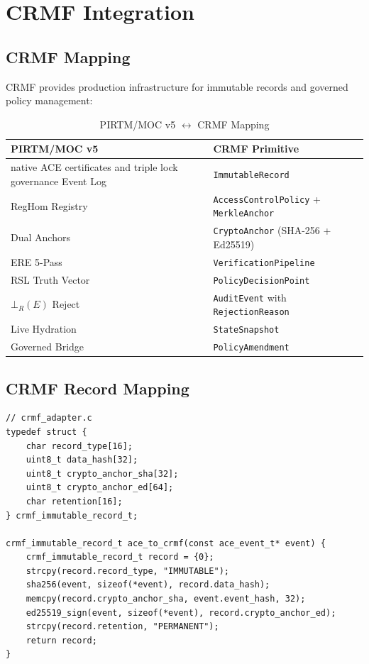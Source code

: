 \documentclass[11pt,a4paper]{article}
\begin{document}
\section{CRMF Integration}

\subsection{CRMF Mapping}

CRMF provides production infrastructure for immutable records and governed policy management:

\begin{table}[h]
\centering
\caption{PIRTM/MOC v5 $\leftrightarrow$ CRMF Mapping}
\label{tab:crmf_mapping}
\begin{tabular}{@{}l l@{}}
\toprule
\textbf{PIRTM/MOC v5} & \textbf{CRMF Primitive} \\
\midrule
native ACE certificates and triple lock governance Event Log & \texttt{ImmutableRecord} \\
RegHom Registry & \texttt{AccessControlPolicy} + \texttt{MerkleAnchor} \\
Dual Anchors & \texttt{CryptoAnchor} (SHA-256 + Ed25519) \\
ERE 5-Pass & \texttt{VerificationPipeline} \\
RSL Truth Vector & \texttt{PolicyDecisionPoint} \\
$\bot_R(E)$ Reject & \texttt{AuditEvent} with \texttt{RejectionReason} \\
Live Hydration & \texttt{StateSnapshot} \\
Governed Bridge & \texttt{PolicyAmendment} \\
\bottomrule
\end{tabular}
\end{table}

\subsection{CRMF Record Mapping}

\begin{lstlisting}[caption={CRMF ImmutableRecord Mapping}, label=lst:crmf]
// crmf_adapter.c
typedef struct {
    char record_type[16];
    uint8_t data_hash[32];
    uint8_t crypto_anchor_sha[32];
    uint8_t crypto_anchor_ed[64];
    char retention[16];
} crmf_immutable_record_t;

crmf_immutable_record_t ace_to_crmf(const ace_event_t* event) {
    crmf_immutable_record_t record = {0};
    strcpy(record.record_type, "IMMUTABLE");
    sha256(event, sizeof(*event), record.data_hash);
    memcpy(record.crypto_anchor_sha, event.event_hash, 32);
    ed25519_sign(event, sizeof(*event), record.crypto_anchor_ed);
    strcpy(record.retention, "PERMANENT");
    return record;
}
\end{lstlisting}
\end{document}
